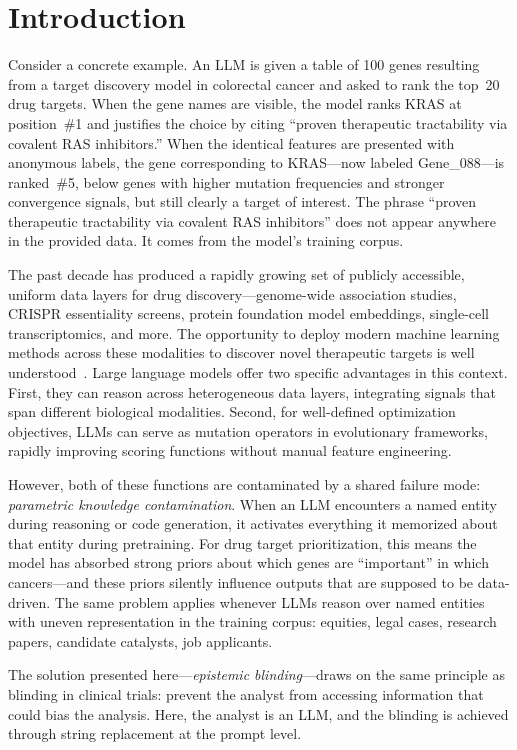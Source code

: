 \documentclass[sigconf, nonacm]{acmart}
\begin{document}
\section{Introduction}

Consider a concrete example. An LLM is given a table of 100 genes resulting from a target discovery model in colorectal cancer and asked to rank the top~20 drug targets. When the gene names are visible, the model ranks KRAS at position~\#1 and justifies the choice by citing ``proven therapeutic tractability via covalent RAS inhibitors.'' When the identical features are presented with anonymous labels, the gene corresponding to KRAS---now labeled Gene\_088---is ranked~\#5, below genes with higher mutation frequencies and stronger convergence signals, but still clearly a target of interest. The phrase ``proven therapeutic tractability via covalent RAS inhibitors'' does not appear anywhere in the provided data. It comes from the model's training corpus.

The past decade has produced a rapidly growing set of publicly accessible, uniform data layers for drug discovery---genome-wide association studies, CRISPR essentiality screens, protein foundation model embeddings, single-cell transcriptomics, and more. The opportunity to deploy modern machine learning methods across these modalities to discover novel therapeutic targets is well understood~\cite{hoadley2018,boiko2023}. Large language models offer two specific advantages in this context. First, they can reason across heterogeneous data layers, integrating signals that span different biological modalities. Second, for well-defined optimization objectives, LLMs can serve as mutation operators in evolutionary frameworks, rapidly improving scoring functions without manual feature engineering.

However, both of these functions are contaminated by a shared failure mode: \textit{parametric knowledge contamination}. When an LLM encounters a named entity during reasoning or code generation, it activates everything it memorized about that entity during pretraining. For drug target prioritization, this means the model has absorbed strong priors about which genes are ``important'' in which cancers---and these priors silently influence outputs that are supposed to be data-driven. The same problem applies whenever LLMs reason over named entities with uneven representation in the training corpus: equities, legal cases, research papers, candidate catalysts, job applicants.

The solution presented here---\textit{epistemic blinding}---draws on the same principle as blinding in clinical trials: prevent the analyst from accessing information that could bias the analysis. Here, the analyst is an LLM, and the blinding is achieved through string replacement at the prompt level.
\end{document}

